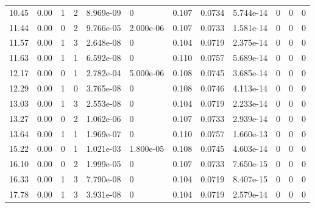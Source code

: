 \documentclass[preview]{standalone}
\begin{document}
{{\begin{tabular}{L{1.2cm}C{1.2cm} C{0.3cm}C{0.5cm} C{1.4cm}C{1.4cm} C{1.4cm}C{1.4cm} C{1.6cm}C{1.6cm} C{1.6cm}C{1.6cm}}
  10.45  &  0.00  & 1     &  2 &  8.969e-09  & 0  &  0.107&   0.0734& 5.744e-14 & 0   &  0 & 0  \\ 
  11.44  &  0.00  & 0     &  2 &  9.766e-05  & 2.000e-06  &  0.107&   0.0733& 1.581e-14 & 0   &  0 & 0  \\ 
  11.57  &  0.00  & 1     &  3 &  2.648e-08  & 0  &  0.104&   0.0719& 2.375e-14 & 0   &  0 & 0  \\ 
  11.63  &  0.00  & 1     &  1 &  6.592e-08  & 0  &  0.110&   0.0757& 5.689e-14 & 0   &  0 & 0  \\ 
  12.17  &  0.00  & 0     &  1 &  2.782e-04  & 5.000e-06  &  0.108&   0.0745& 3.685e-14 & 0   &  0 & 0  \\ 
  12.29  &  0.00  & 1     &  0 &  3.765e-08  & 0  &  0.108&   0.0746& 4.113e-14 & 0   &  0 & 0  \\ 
  13.03  &  0.00  & 1     &  3 &  2.553e-08  & 0  &  0.104&   0.0719& 2.233e-14 & 0   &  0 & 0  \\ 
  13.27  &  0.00  & 0     &  2 &  1.062e-06  & 0  &  0.107&   0.0733& 2.939e-14 & 0   &  0 & 0  \\ 
  13.64  &  0.00  & 1     &  1 &  1.969e-07  & 0  &  0.110&   0.0757& 1.660e-13 & 0   &  0 & 0  \\ 
  15.22  &  0.00  & 0     &  1 &  1.021e-03  & 1.800e-05  &  0.108&   0.0745& 4.603e-14 & 0   &  0 & 0  \\ 
  16.10  &  0.00  & 0     &  2 &  1.999e-05  & 0  &  0.107&   0.0733& 7.650e-15 & 0   &  0 & 0  \\ 
  16.33  &  0.00  & 1     &  3 &  7.790e-08  & 0  &  0.104&   0.0719& 8.407e-15 & 0   &  0 & 0  \\ 
  17.78  &  0.00  & 1     &  3 &  3.931e-08  & 0  &  0.104&   0.0719& 2.579e-14 & 0   &  0 & 0  \\ 
\hline 
\end{tabular} 

}}
\end{document}
